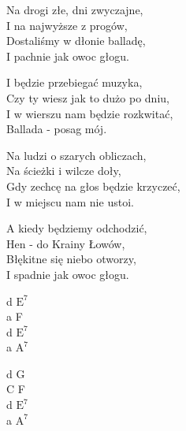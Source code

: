 \begin{text}
    Na drogi złe, dni zwyczajne,\\
    I na najwyższe z progów,\\
    Dostaliśmy w dłonie balladę,\\
    I pachnie jak owoc głogu.

    \vin I będzie przebiegać muzyka,\\
    \vin Czy ty wiesz jak to dużo po dniu,\\
    \vin I w wierszu nam będzie rozkwitać,\\
    \vin Ballada - posag mój.

    Na ludzi o szarych obliczach,\\
    Na ścieżki i wilcze doły,\\
    Gdy zechcę na głos będzie krzyczeć,\\
    I w miejscu nam nie ustoi.

    A kiedy będziemy odchodzić,\\
    Hen - do Krainy Łowów,\\
    Błękitne się niebo otworzy,\\
    I spadnie jak owoc głogu.
\end{text}
\begin{chord}
    d $\mathrm{E^{7}}$\\
    a F\\
    d $\mathrm{E^{7}}$\\
    a $\mathrm{A^{7}}$

    d G\\
    C F\\
    d $\mathrm{E^{7}}$\\
    a $\mathrm{A^{7}}$
\end{chord}
